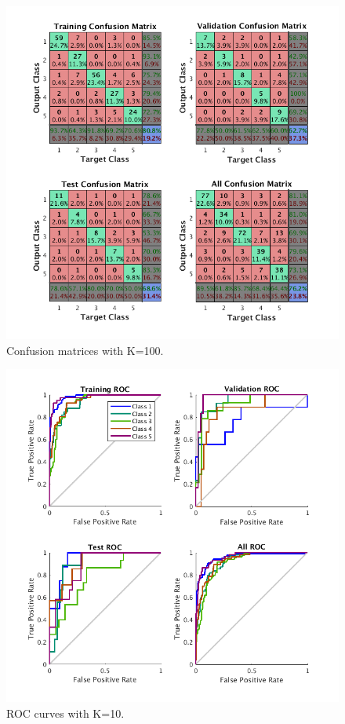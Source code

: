 \documentclass{article}
\begin{document}
\begin{figure}[h]
\centering
\includegraphics[scale=0.5]{Figures/Metrics/conf_k100}
\caption{Confusion matrices with K=100.}
\label{fig:k100}
\end{figure}
\begin{figure}[h]
\centering
\includegraphics[scale=0.5]{Figures/Metrics/roc_k10}
\caption{ROC curves with K=10.}
\label{fig:r10}
\end{figure}
\end{document}
